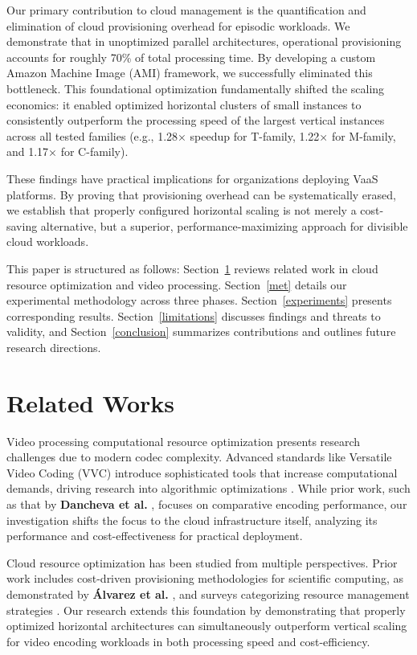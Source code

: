 \documentclass[conference]{IEEEtran}
\begin{document}
	Our primary contribution to cloud management is the quantification and elimination of cloud provisioning overhead for episodic workloads. We demonstrate that in unoptimized parallel architectures, operational provisioning accounts for roughly 70\% of total processing time. By developing a custom Amazon Machine Image (AMI) framework, we successfully eliminated this bottleneck. This foundational optimization fundamentally shifted the scaling economics: it enabled optimized horizontal clusters of small instances to consistently outperform the processing speed of the largest vertical instances across all tested families (e.g., 1.28× speedup for T-family, 1.22× for M-family, and 1.17× for C-family).
	
	These findings have practical implications for organizations deploying VaaS platforms. By proving that provisioning overhead can be systematically erased, we establish that properly configured horizontal scaling is not merely a cost-saving alternative, but a superior, performance-maximizing approach for divisible cloud workloads.
	
	This paper is structured as follows: Section~\ref{rel_works} reviews related work in cloud resource optimization and video processing. Section~\ref{met} details our experimental methodology across three phases. Section~\ref{experiments} presents corresponding results. Section~\ref{limitations} discusses findings and threats to validity, and Section~\ref{conclusion} summarizes contributions and outlines future research directions.
	
	\section{Related Works}
	\label{rel_works}
	
	Video processing computational resource optimization presents research challenges due to modern codec complexity. Advanced standards like Versatile Video Coding (VVC) introduce sophisticated tools that increase computational demands, driving research into algorithmic optimizations \cite{b15, b16}. While prior work, such as that by \textbf{Dancheva et al.} \cite{b3}, focuses on comparative encoding performance, our investigation shifts the focus to the cloud infrastructure itself, analyzing its performance and cost-effectiveness for practical deployment.
	
	Cloud resource optimization has been studied from multiple perspectives. Prior work includes cost-driven provisioning methodologies for scientific computing, as demonstrated by \textbf{Álvarez et al.} \cite{b2}, and surveys categorizing resource management strategies \cite{b4}. Our research extends this foundation by demonstrating that properly optimized horizontal architectures can simultaneously outperform vertical scaling for video encoding workloads in both processing speed and cost-efficiency.
	
\end{document}
